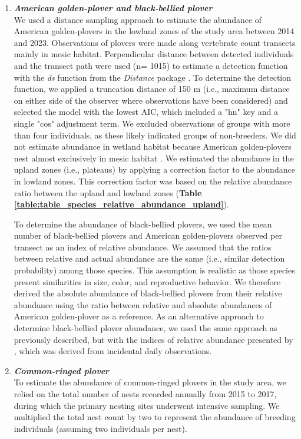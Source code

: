 \documentclass[a4paper,twoside,12pt]{article}
\begin{document}
\begin{enumerate}[label=\alph*.]
                \item[] \textit{\textbf{American golden-plover and black-bellied plover}}\\
                We used a distance sampling approach to estimate the abundance of American golden-plovers in the lowland zones of the study area between 2014 and 2023. Observations of plovers were made along vertebrate count transects mainly in mesic habitat. Perpendicular distance between detected individuals and the transect path were used (n= 1015) to estimate a detection function with the \textit{ds} function from the \textit{Distance} package \citep{miller2019}. To determine the detection function, we applied a truncation distance of 150 m (i.e., maximum distance on either side of the observer where observations have been considered) and selected the model with the lowest AIC, which included a "hn" key and a single "cos" adjustment term. We excluded observations of groups with more than four individuals, as these likely indicated groups of non-breeders. We did not estimate abundance in wetland habitat because American golden-plovers nest almost exclusively in mesic habitat \citep{parmelee1967}. We estimated the abundance in the upland zones (i.e., plateaus) by applying a correction factor to the abundance in lowland zones. This correction factor was based on the relative abundance ratio between the upland and lowland zones (\textbf{Table \ref{table:table_species_relative_abundance_upland}}).
                
To determine the abundance of black-bellied plovers, we used the mean number of black-bellied plovers and American golden-plovers observed per transect as an index of relative abundance. We assumed that the ratios between relative and actual abundance are the same (i.e., similar detection probability) among those species. This assumption is realistic as those species present similarities in size, color, and reproductive behavior. We therefore derived the absolute abundance of black-bellied plovers from their relative abundance using the ratio between relative and absolute abundances of American golden-plover as a reference. As an alternative approach to determine black-bellied plover abundance, we used the same approach as previously described, but with the indices of relative abundance presented by \citet{gauthier2024a}, which was derived from incidental daily observations.

                \item[] \textit{\textbf{Common-ringed plover}}\\
                To estimate the abundance of common-ringed plovers in the study area, we relied on the total number of nests recorded annually from 2015 to 2017, during which the primary nesting sites underwent intensive sampling. We multiplied the total nest count by two to represent the abundance of breeding individuals (assuming two individuals per nest).
                

\end{enumerate}
\end{document}
